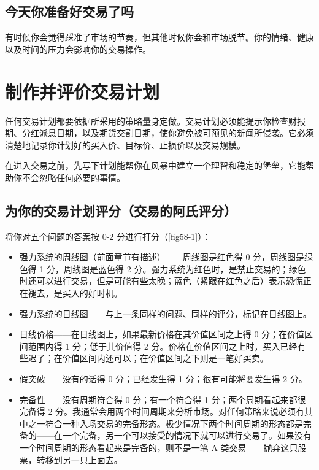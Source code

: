 \subsection*{今天你准备好交易了吗}
有时候你会觉得踩准了市场的节奏，但其他时候你会和市场脱节。你的情绪、健康以及时间的压力会影响你的交易操作。
\section{制作并评价交易计划}
任何交易计划都要依据所采用的策略量身定做。交易计划必须能提示你检查财报期、分红派息日期，以及期货交割日期，使你避免被可预见的新闻所侵袭。它必须清楚地记录你计划好的买入价、目标价、止损价以及交易规模。

在进入交易之前，先写下计划能帮你在风暴中建立一个理智和稳定的堡垒，它能帮助你不会忽略任何必要的事情。
\subsection*{为你的交易计划评分（交易的阿氏评分）}
将你对五个问题的答案按 0-2 分进行打分（\autoref{fig58-1}）：
\begin{itemize}
    \item 强力系统的周线图（前面章节有描述）——周线图是红色得 0 分，周线图是绿色得 1 分，周线图是蓝色得 2 分。强力系统为红色时，是禁止交易的；绿色时还可以进行交易，但是可能有些太晚；蓝色（紧跟在红色之后）表示恐慌正在褪去，是买入的好时机。
    \item 强力系统的日线图——与上一条同样的问题、同样的评分，标记在日线图上。
    \item 日线价格——在日线图上，如果最新价格在其价值区间之上得 0 分；在价值区间范围内得 1 分；低于其价值得 2 分。价格在价值区间之上时，买入已经有些迟了；在价值区间内还可以；在价值区间之下则是一笔好买卖。
    \item 假突破——没有的话得 0 分；已经发生得 1 分；很有可能将要发生得 2 分。
    \item 完备性——没有周期符合得 0 分；有一个符合得 1 分；两个周期看起来都很完备得 2 分。我通常会用两个时间周期来分析市场。对任何策略来说必须有其中之一符合一种入场交易的完备形态。极少情况下两个时间周期的形态都是完备的——在一个完备，另一个可以接受的情况下就可以进行交易了。如果没有一个时间周期的形态看起来是完备的，则不是一笔 A 类交易——抛弃这只股票，转移到另一只上面去。
\end{itemize}

